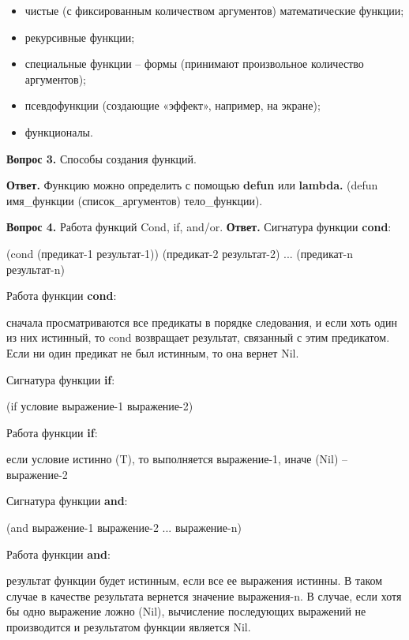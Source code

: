 \documentclass[12pt]{report}
\begin{document}
\begin{itemize}
	\item чистые (с фиксированным количеством аргументов) математические функции;
	\item рекурсивные функции;
	\item специальные функции – формы (принимают произвольное количество аргументов);
	\item псевдофункции (создающие «эффект», например, на экране);
	\item функционалы.
\end{itemize}

\textbf{Вопрос 3.} Способы создания функций.
	
\textbf{Ответ.} 
Функцию можно определить с помощью \textbf{defun} или \textbf{lambda.} (defun имя\_функции (список\_аргументов) тело\_функции).

\textbf{Вопрос 4.} Работа функций Cond, if, and/or. \newline
\indent\textbf{Ответ. }
Сигнатура функции \textbf{cond}:

\indent(cond (предикат-1 результат-1)) \newline
\indent(предикат-2 результат-2) \newline
\indent...\newline
\indent(предикат-n результат-n)\newline

\indent Работа функции \textbf{cond}: 

сначала просматриваются все предикаты в порядке следования, и если хоть один из них истинный, то cond возвращает результат, связанный с этим предикатом. Если ни один предикат не был истинным, то она вернет Nil. 

Сигнатура функции \textbf{if}: 

(if условие выражение-1 выражение-2)\newline

\indent Работа функции \textbf{if}: 

если условие истинно (T), то выполняется выражение-1, иначе (Nil) – выражение-2\newline

Сигнатура функции \textbf{and}: 

(and выражение-1 выражение-2 ... выражение-n)\newline

\indent Работа функции \textbf{and}: 

результат функции будет истинным, если все ее выражения истинны. В таком случае в качестве результата вернется значение выражения-n. В случае, если хотя бы одно выражение ложно (Nil), вычисление последующих выражений не производится и результатом функции является Nil.\newline
\end{document}
